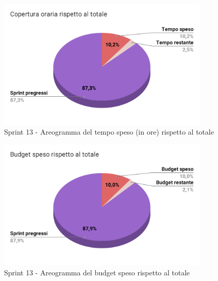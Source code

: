   \begin{figure}[H]
    \centering
    \includegraphics[width=0.90\textwidth]{assets/Consuntivo/Sprint-13/copertura_oraria.pdf}
    \caption{Sprint 13 - Areogramma del tempo speso (in ore) rispetto al totale}
  \end{figure}

  \begin{figure}[H]
    \centering
    \includegraphics[width=0.90\textwidth]{assets/Consuntivo/Sprint-13/budget_speso.pdf}
    \caption{Sprint 13 - Areogramma del budget speso rispetto al totale}
  \end{figure}

